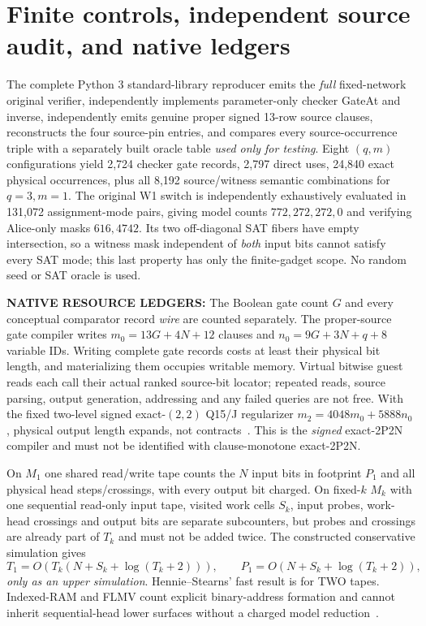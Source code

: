 \documentclass[11pt]{article}
\begin{document}
\section{Finite controls, independent source audit, and native ledgers}
The complete Python 3 standard-library reproducer emits the \emph{full}
fixed-network original verifier, independently implements parameter-only
checker GateAt and inverse, independently emits genuine proper signed
13-row source clauses, reconstructs the four source-pin entries, and
compares every source-occurrence triple with a separately built
oracle table \emph{used only for testing}. Eight $(q,m)$
configurations yield 2,724 checker gate records, 2,797 direct uses,
24,840 exact physical occurrences, plus all 8,192 source/witness
semantic combinations for $q=3,m=1$. The original W1 switch
is independently exhaustively evaluated in 131,072 assignment-mode
pairs, giving model counts $772,272,272,0$ and verifying Alice-only
masks $616,4742$. Its two off-diagonal SAT fibers have empty
intersection, so a witness mask independent of \emph{both} input bits
cannot satisfy every SAT mode; this last property has only the
finite-gadget scope. No random seed or SAT oracle is used.

\textbf{NATIVE RESOURCE LEDGERS:}
The Boolean gate count $G$ and every conceptual comparator record
\emph{wire} are counted separately. The proper-source gate compiler
writes $m_0=13G+4N+12$ clauses and $n_0=9G+3N+q+8$ variable IDs.
Writing complete gate records costs at least their physical bit length,
and materializing them occupies writable memory. Virtual bitwise guest
reads each call their actual ranked source-bit locator; repeated reads,
source parsing, output generation, addressing and any failed queries
are not free. With the fixed two-level signed exact-$(2,2)$ Q15/J
regularizer $m_2=4048m_0+5888n_0$, physical output length expands,
not contracts~\cite{floor}. This is the \emph{signed} exact-2P2N
compiler and must not be identified with clause-monotone exact-2P2N.

On $M_1$ one shared read/write tape counts the $N$ input bits in
footprint $P_1$ and all physical head steps/crossings, with every
output bit charged. On fixed-$k$ $M_k$ with one sequential read-only
input tape, visited work cells $S_k$, input probes, work-head
crossings and output bits are separate subcounters, but probes and
crossings are already part of $T_k$ and must not be added twice.
The constructed conservative simulation gives
\[
 T_1=O(T_k(N+S_k+\log(T_k+2))),\qquad
 P_1=O(N+S_k+\log(T_k+2)),
\]
\emph{only as an upper simulation}. Hennie--Stearns' fast result is
for TWO tapes. Indexed-RAM and FLMV count explicit binary-address
formation and cannot inherit sequential-head lower surfaces
without a charged model reduction~\cite{flmv,hs}.
\end{document}

